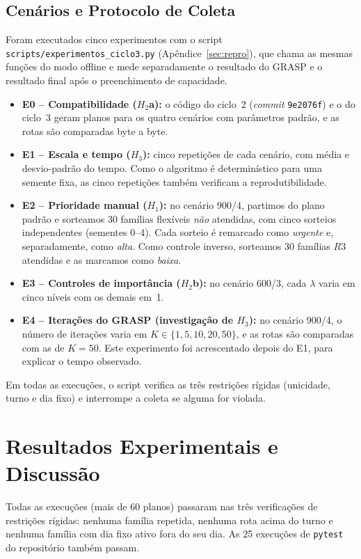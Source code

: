 \documentclass[11pt,a4paper]{article}
\begin{document}
\subsection{Cenários e Protocolo de Coleta}

Foram executados cinco experimentos com o script \texttt{scripts/experimentos\_ciclo3.py} (Apêndice~\ref{sec:repro}), que chama as mesmas funções do modo offline e mede separadamente o resultado do GRASP e o resultado final após o preenchimento de capacidade.
\begin{itemize}
    \item \textbf{E0 -- Compatibilidade ($H_2$a):} o código do ciclo~2 (\emph{commit} \texttt{9e2076f}) e o do ciclo~3 geram planos para os quatro cenários com parâmetros padrão, e as rotas são comparadas byte a byte.
    \item \textbf{E1 -- Escala e tempo ($H_3$):} cinco repetições de cada cenário, com média e desvio-padrão do tempo. Como o algoritmo é determinístico para uma semente fixa, as cinco repetições também verificam a reprodutibilidade.
    \item \textbf{E2 -- Prioridade manual ($H_1$):} no cenário 900/4, partimos do plano padrão e sorteamos 30 famílias flexíveis \emph{não} atendidas, com cinco sorteios independentes (sementes 0--4). Cada sorteio é remarcado como \emph{urgente} e, separadamente, como \emph{alta}. Como controle inverso, sorteamos 30 famílias $R3$ atendidas e as marcamos como \emph{baixa}.
    \item \textbf{E3 -- Controles de importância ($H_2$b):} no cenário 600/3, cada $\lambda$ varia em cinco níveis com os demais em~1.
    \item \textbf{E4 -- Iterações do GRASP (investigação de $H_3$):} no cenário 900/4, o número de iterações varia em $K \in \{1,5,10,20,50\}$, e as rotas são comparadas com as de $K=50$. Este experimento foi acrescentado depois do E1, para explicar o tempo observado.
\end{itemize}
Em todas as execuções, o script verifica as três restrições rígidas (unicidade, turno e dia fixo) e interrompe a coleta se alguma for violada.

\section{Resultados Experimentais e Discussão}
\label{sec:resultados}

Todas as execuções (mais de 60 planos) passaram nas três verificações de restrições rígidas: nenhuma família repetida, nenhuma rota acima do turno e nenhuma família com dia fixo ativo fora do seu dia. As 25 execuções de \texttt{pytest} do repositório também passam.
\end{document}
